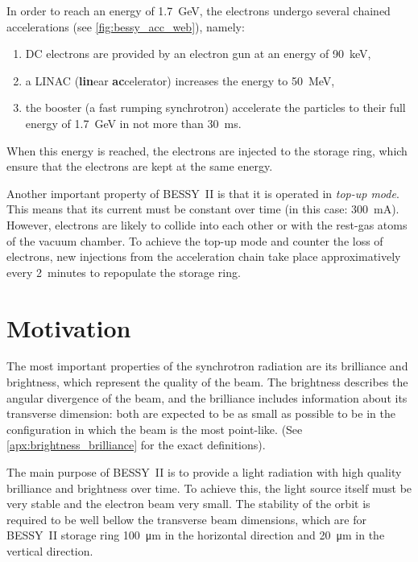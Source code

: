 In order to reach an energy of \SI{1.7}{\giga\electronvolt}, the electrons undergo several chained accelerations (see \cref{fig:bessy_acc_web}), namely:
\begin{enumerate}
    \item DC electrons are provided by an electron gun at an energy of \SI{90}{\kilo\electronvolt},
    \item a LINAC (\textbf{lin}ear \textbf{ac}celerator) increases the energy to \SI{50}{\mega\electronvolt},
    \item the booster (a fast rumping synchrotron) accelerate the particles to their full energy of \SI{1.7}{\giga\electronvolt} in not more than \SI{30}{\milli\second}.
\end{enumerate}

When this energy is reached, the electrons are injected to the storage ring, which ensure that the electrons are kept at the same energy.

Another important property of BESSY~II is that it is operated in \textit{top-up mode}. This means that its current must be constant over time (in this case: \SI{300}{\milli\ampere}). However, electrons are likely to collide into each other or with the rest-gas atoms of the vacuum chamber. To achieve the top-up mode and counter the loss of electrons, new injections from the acceleration chain take place approximatively every 2~minutes to repopulate the storage ring.

\section{Motivation}
The most important properties of the synchrotron radiation are its brilliance and brightness, which represent the quality of the beam. The brightness describes the angular divergence of the beam, and the brilliance includes information about its transverse dimension: both are expected to be as small as possible to be in the configuration in which the beam is the most point-like. (See \cref{apx:brightness_brilliance} for the exact definitions).

The main purpose of BESSY~II is to provide a light radiation with high quality brilliance and brightness over time. To achieve this, the light source itself must be very stable and the electron beam very small. The stability of the orbit is required to be well bellow the transverse beam dimensions, which are for BESSY~II storage ring \SI{100}{\micro\meter} in the horizontal direction and \SI{20}{\micro\meter} in the vertical direction.

